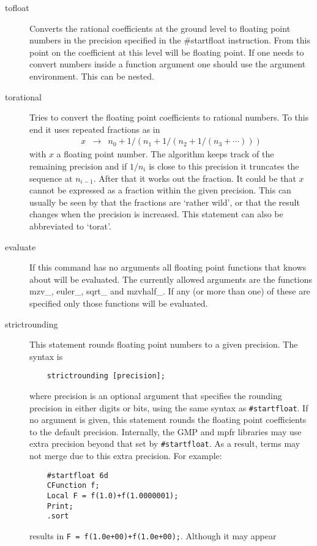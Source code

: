 \begin{description}
\item[tofloat] Converts the rational coefficients at the ground level to 
floating point numbers in the precision specified in the \#startfloat 
instruction. From this point on the coefficient at this level will be 
floating point. If one needs to convert numbers inside a function argument 
one should use the argument environment. This can be nested.
\item[torational] Tries to convert the floating point coefficients to 
rational numbers. To this end it uses repeated fractions as in
\begin{eqnarray}
	x & \rightarrow & n_0 + 1/(n_1+1/(n_2+1/(n_3+\cdots))) \nonumber
\end{eqnarray}
with $x$ a floating point number. The algorithm keeps track of the 
remaining precision and if $1/n_i$ is close to this precision it truncates 
the sequence at $n_{i-1}$. After that it works out the fraction. It could 
be that $x$ cannot be expressed as a fraction within the given precision. 
This can usually be seen by that the fractions are `rather wild', or that 
the result changes when the precision is increased. This statement can also 
be abbreviated to `torat'.
\item[evaluate] If this command has no arguments all floating point 
functions that \FORM{} knows about will be evaluated. The currently allowed 
arguments are the functions mzv\_, euler\_, sqrt\_ and mzvhalf\_. If any 
(or more than one) of these are specified only those functions will be 
evaluated.
\item[strictrounding] This statement rounds floating point numbers to a 
given precision. The syntax is
\begin{verbatim}
    strictrounding [precision];
\end{verbatim}
where precision is an optional argument that specifies the rounding 
precision in either digits or bits, using the same syntax as 
\texttt{\#startfloat}. If no argument is given, this statement rounds 
the floating point coefficients to the default precision. Internally, 
the GMP and mpfr libraries may use extra precision beyond that set by 
\texttt{\#startfloat}. As a result, terms may not merge due to this 
extra precision. For example:
\begin{verbatim}
    #startfloat 6d
    CFunction f;
    Local F = f(1.0)+f(1.0000001);
    Print;
    .sort
\end{verbatim}
results in \texttt{F = f(1.0e+00)+f(1.0e+00);}. Although it may appear 

\end{description}
